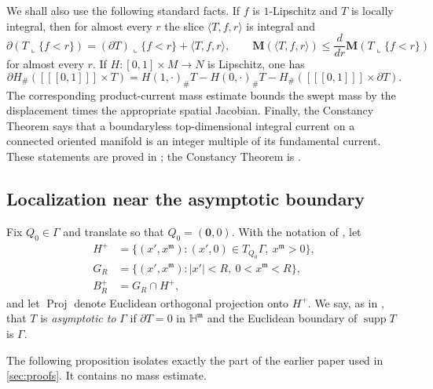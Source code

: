 \documentclass[11pt,reqno]{amsart}
\numberwithin{equation}{section}
\theoremstyle{definition}
\theoremstyle{remark}
\newcommand{\Hyp}{\mathbb H}
\newcommand{\Mass}{\mathbf M}
\newcommand{\supp}{\operatorname{supp}}
\newcommand{\Proj}{\operatorname{Proj}}
\newcommand{\restr}{\mathbin{\llcorner}}
\newcommand{\cur}[1]{\left[\!\left[#1\right]\!\right]}
\begin{document}
We shall also use the following standard facts.  If $f$ is $1$-Lipschitz and
$T$ is locally integral, then for almost every $r$ the slice
$\langle T,f,r\rangle$ is integral and
\begin{equation}\label{eq:slicing-facts}
 \partial(T\restr\{f<r\})
 = (\partial T)\restr\{f<r\}+\langle T,f,r\rangle,
 \qquad
 \Mass(\langle T,f,r\rangle)
 \le \frac{d}{dr}\Mass(T\restr\{f<r\})
\end{equation}
for almost every $r$.   If $H:[0,1]\times M\to N$ is Lipschitz, one has
\begin{equation}\label{eq:homotopy-formula}
 \partial H_\#(\cur{[0,1]}\times T)
 =H(1,\cdot)_\#T-H(0,\cdot)_\#T
  -H_\#(\cur{[0,1]}\times\partial T).
\end{equation}
The corresponding product-current mass estimate bounds the swept mass by
the displacement times the appropriate spatial Jacobian.  Finally, the
Constancy Theorem says that a boundaryless top-dimensional integral current
on a connected oriented manifold is an integer multiple of its fundamental
current.  These statements are proved in
\cite[Sections~4.1 and~4.3]{Federer}; the Constancy Theorem is
\cite[4.1.7]{Federer}.

\subsection{Localization near the asymptotic boundary}
\label{sec:boundary-prelim}

Fix $Q_0\in\Gamma$ and translate so that $Q_0=(\mathbf0,0)$.  With the notation
of \cite[(1.3)--(1.7)]{JiangXie}, let
\begin{align}
 H^+&=\{(x',x^{\mathfrak m}):(x',0)\in T_{Q_0}\Gamma,
                    \ x^{\mathfrak m}>0\},\label{eq:Hplus}\\
 G_R&=\{(x',x^{\mathfrak m}):|x'|<R,
                    \ 0<x^{\mathfrak m}<R\},\label{eq:GR}\\
 B_R^+&=G_R\cap H^+,\label{eq:BRplus}
\end{align}
and let $\Proj$ denote Euclidean orthogonal projection onto $H^+$.  We say,
as in \cite[Section~2]{JiangXie}, that $T$ is \emph{asymptotic to} $\Gamma$
if $\partial T=0$ in $\Hyp^{\mathfrak m}$ and the Euclidean boundary of
$\supp T$ is $\Gamma$.

The following proposition isolates exactly the part of the earlier paper
used in \cref{sec:proofs}.  It contains no mass estimate.
\end{document}
